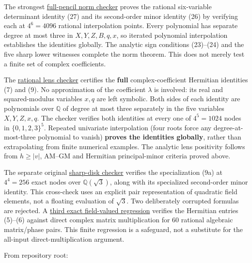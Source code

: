 \documentclass[
  11pt,
]{article}
\begin{document}
The strongest
\href{../../notes/complex-permanent-determinant/check_full_norm.py}{full-pencil
norm checker} proves the rational six-variable determinant identity (27)
and its second-order minor identity (26) by verifying each at
\(4^6=4096\) rational interpolation points. Every polynomial has
separate degree at most three in \(X,Y,Z,B,q,x\), so iterated polynomial
interpolation establishes the identities globally. The analytic sign
conditions (23)--(24) and the five sharp lower witnesses complete the
norm theorem. This does not merely test a finite set of complex
coefficients.

The
\href{../../notes/complex-permanent-determinant/check_lens.py}{rational
lens checker} certifies the \textbf{full} complex-coefficient Hermitian
identities (7) and (9). No approximation of the coefficient \(\lambda\)
is involved: its real and squared-modulus variables \(x,q\) are left
symbolic. Both sides of each identity are polynomials over \(\mathbb Q\)
of degree at most three separately in the five variables \(X,Y,Z,x,q\).
The checker verifies both identities at every one of \(4^5=1024\) nodes
in \(\{0,1,2,3\}^5\). Repeated univariate interpolation (four roots
force any degree-at-most-three polynomial to vanish) \textbf{proves the
identities globally}, rather than extrapolating from finite numerical
examples. The analytic lens positivity follows from \(h\ge|v|\), AM--GM
and Hermitian principal-minor criteria proved above.

The separate original
\href{../../notes/complex-permanent-determinant/check.py}{sharp-disk
checker} verifies the specialization (9a) at \(4^4=256\) exact nodes
over \(\mathbb Q(\sqrt3)\), along with its specialized second-order
minor identity. This cross-check uses an explicit pair representation of
quadratic field elements, not a floating evaluation of \(\sqrt3\). Two
deliberately corrupted formulas are rejected. A
\href{../../notes/complex-permanent-determinant/check_matrix.py}{third
exact field-valued regression} verifies the Hermitian entries (5)--(6)
against direct complex matrix multiplication for 60 rational algebraic
matrix/phase pairs. This finite regression is a safeguard, not a
substitute for the all-input direct-multiplication argument.

From repository root:
\end{document}
